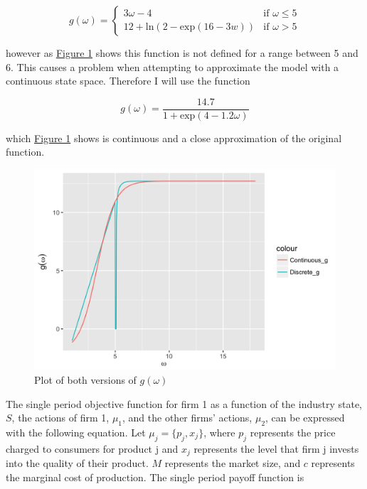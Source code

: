 \documentclass[12pt]{article}
\begin{document}
\begin{equation*}
  g(\omega) =
  \begin{cases}
    3\omega-4 & \text{if } \omega \leq 5\\
    12+\text{ln}(2-\text{exp}(16-3w)) & \text{if } \omega >5
  \end{cases}
\end{equation*}

however as \hyperref[plot_g]{Figure 1} shows this function is not defined for a range between 5 and 6. This causes a problem when attempting to approximate the model with a continuous state space. Therefore I will use the function

\begin{equation*}
  g(\omega) = \frac{14.7}{1+\text{exp}(4-1.2\omega)}
\end{equation*}

which \hyperref[plot_g]{Figure 1} shows is continuous and a close approximation of the original function.

\begin{figure}[H]
  \centering
  \includegraphics{plot_g}
  \caption{Plot of both versions of $g(\omega)$}
  \label{plot_g}
\end{figure}

The single period objective function for firm 1 as a function of the industry state, $S$, the actions of firm 1, $\mu_1$, and the other firms' actions, $\mu_2$, can be expressed with the following equation. Let $\mu_j=\{p_j,x_j\}$, where $p_j$ represents the price charged to consumers for product j and $x_j$ represents the level that firm j invests into the quality of their product. $M$ represents the market size, and $c$ represents the marginal cost of production. The single period payoff function is
\end{document}
